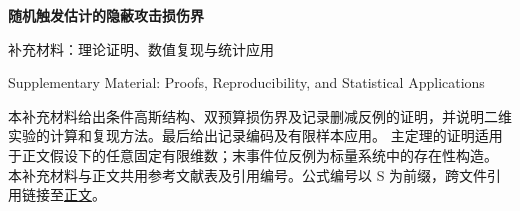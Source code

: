 \documentclass[final,3p,11pt]{elsarticle}
\begin{document}
\begin{center}
{\Large\bfseries 随机触发估计的隐蔽攻击损伤界}\par\medskip
{\large 补充材料：理论证明、数值复现与统计应用}\par\smallskip
{\small Supplementary Material: Proofs, Reproducibility, and Statistical Applications}
\end{center}
本补充材料给出条件高斯结构、双预算损伤界及记录删减反例的证明，并说明二维实验的计算和复现方法。最后给出记录编码及有限样本应用。
主定理的证明适用于正文假设下的任意固定有限维数；末事件位反例为标量系统中的存在性构造。
本补充材料与正文共用参考文献表及引用编号。公式编号以 S 为前缀，跨文件引用链接至\href{paper.pdf}{正文}。
\appendix
\renewcommand{\thesection}{\Alph{section}}
\renewcommand{\thesubsection}{\thesection.\arabic{subsection}}
\renewcommand{\theequation}{S\arabic{equation}}
\setcounter{equation}{0}
\renewcommand{\thepage}{S\arabic{page}}





\end{document}
